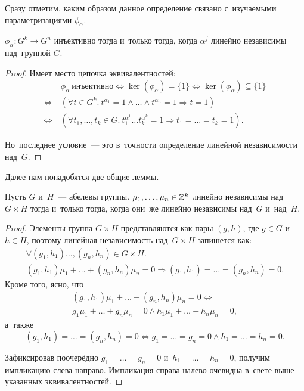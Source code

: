 \documentclass[a4paper,oneside]{article}
\begin{document}
Сразу отметим, каким образом данное определение связано с~изучаемыми параметризациями $\phi_\alpha$.

\begin{theorem}
  $\phi_\alpha : G^k \rightarrow G^n$ инъективно тогда и~только тогда, когда $\alpha^j$ линейно независимы над~группой $G$.
\end{theorem}

\begin{proof}
  Имеет место цепочка эквивалентностей:
  \[
  \begin{aligned}
                     \ & \phi_\alpha\ \text{инъективно}
      \Leftrightarrow \ker(\phi_\alpha) = \{ 1 \}
      \Leftrightarrow \ker(\phi_\alpha) \subseteq \{ 1 \} \\
      \Leftrightarrow\ & (\forall t \in G^k.\ t^{\alpha_1} = 1 \wedge \ldots \wedge t^{\alpha_n} = 1 \Rightarrow t = 1) \\
      \Leftrightarrow\ & (\forall t_1, \ldots, t_k \in G.\ t_1^{\alpha^1} \ldots t_k^{\alpha^k} = 1 \Rightarrow t_1 = \ldots = t_k = 1).
  \end{aligned}
  \]

  Но~последнее условие~— это в~точности определение линейной независимости над~$G$.
\end{proof}

Далее нам понадобятся две общие леммы.

\begin{lemma}
  Пусть $G$ и~$H$~— абелевы группы. $\mu_1, \ldots, \mu_n \in \mathbb{Z}^k$ линейно независимы над~$G \times H$
  тогда и~только тогда, когда они~же линейно независимы над~$G$ и~над~$H$.
\end{lemma}

\begin{proof}
  Элементы группа $G \times H$ представляются как пары $(g, h)$, где $g \in G$ и~$h \in H$, поэтому
  линейная независимость над~$G \times H$ запишется как:
  \begin{gather*}
    \forall (g_1, h_1) \ldots, (g_n, h_n) \in G \times H.\\ (g_1, h_1) \mu_1 + \ldots + (g_n, h_n) \mu_n = 0 \Rightarrow (g_1, h_1) = \ldots = (g_n, h_n) = 0.
  \end{gather*}
  Кроме того, ясно, что
  \begin{gather*}
    (g_1, h_1) \mu_1 + \ldots + (g_n, h_n) \mu_n = 0 \Leftrightarrow\\ g_1 \mu_1 + \ldots + g_n \mu_n = 0 \wedge h_1 \mu_1 + \ldots + h_n \mu_n = 0,
  \end{gather*}
  а~также
  \[
    (g_1, h_1) = \ldots = (g_n, h_n) = 0 \Leftrightarrow g_1 = \ldots = g_n = 0 \wedge h_1 = \ldots = h_n = 0.
  \]

  Зафиксировав поочерёдно $g_1 = \ldots = g_n = 0$ и~$h_1 = \ldots = h_n = 0$, получим импликацию слева направо.
  Импликация справа налево очевидна в~свете выше указанных эквивалентностей.
\end{proof}
\end{document}
